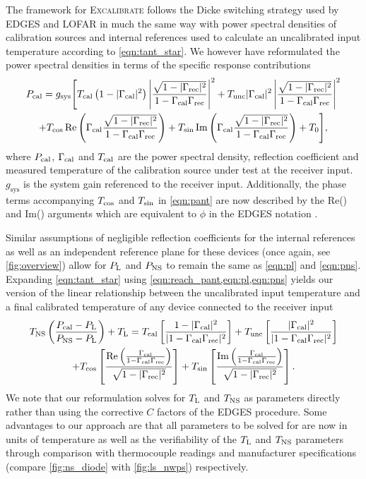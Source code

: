 The framework for \textsc{Excalibrate} follows the Dicke switching strategy used by EDGES \citep{edgesCal} and LOFAR \citep{lofarCal} in much the same way with power spectral densities of calibration sources and internal references used to calculate an uncalibrated input temperature according to \cref{eqn:tant_star}. We however have reformulated the power spectral densities in terms of the specific response contributions
\begin{multline}
    \label{eqn:reach_pant}
    P_{\mathrm{cal}} = g_{\mathrm{sys}} \Bigg[ T_{\mathrm{cal}}\left(1-|\Gamma_{\mathrm{cal}}|^2\right)\left|\frac{\sqrt{1 - |\Gamma_{\mathrm{rec}}|^2}}{1-\Gamma_{\mathrm{cal}}\Gamma_{\mathrm{rec}}}\right|^2 + T_{\mathrm{unc}}|\Gamma_{\mathrm{cal}}|^2\left|\frac{\sqrt{1 - |\Gamma_{\mathrm{rec}}|^2}}{1-\Gamma_{\mathrm{cal}}\Gamma_{\mathrm{rec}}}\right|^2 \\
    + T_{\mathrm{cos}}\operatorname{Re}\left(\Gamma_{\mathrm{cal}}\frac{\sqrt{1 - |\Gamma_{\mathrm{rec}}|^2}}{1-\Gamma_{\mathrm{cal}}\Gamma_{\mathrm{rec}}}\right) + T_{\mathrm{sin}}\operatorname{Im}\left(\Gamma_{\mathrm{cal}}\frac{\sqrt{1 - |\Gamma_{\mathrm{rec}}|^2}}{1-\Gamma_{\mathrm{cal}}\Gamma_{\mathrm{rec}}}\right) + T_0 \Bigg],
\end{multline}
where $P_{\mathrm{cal}}$, $\Gamma_{\mathrm{cal}}$ and $T_{\mathrm{cal}}$ are the power spectral density, reflection coefficient and measured temperature of the calibration source under test at the receiver input. $g_{\mathrm{sys}}$ is the system gain referenced to the receiver input. Additionally, the phase terms accompanying $T_{\mathrm{cos}}$ and $T_{\mathrm{sin}}$ in \cref{eqn:pant} are now described by the Re() and Im() arguments which are equivalent to $\phi$ in the EDGES notation \cite{rogersCal}.

Similar assumptions of negligible reflection coefficients for the internal references as well as an independent reference plane for these devices (once again, see \cref{fig:overview}) allow for $P_{\mathrm{L}}$ and $P_{\mathrm{NS}}$ to remain the same as \cref{eqn:pl} and \cref{eqn:pns}. Expanding \cref{eqn:tant_star} using \cref{eqn:reach_pant,eqn:pl,eqn:pns} yields our version of the linear relationship between the uncalibrated input temperature and a final calibrated temperature of any device connected to the receiver input
\begin{multline}
    \label{eqn:caleqn}
    T_{\mathrm{NS}}\left( \frac{P_{\mathrm{cal}} - P_{\mathrm{L}}}{P_{\mathrm{NS}} - P_{\mathrm{L}}} \right) + T_{\mathrm{L}} = T_{\mathrm{cal}}\left[ \frac{1-|\Gamma_{\mathrm{cal}}|^2}{|1-\Gamma_{\mathrm{cal}}\Gamma_{\mathrm{rec}}|^2} \right] + T_{\mathrm{unc}}\left[ \frac{|\Gamma_{\mathrm{cal}}|^2}{|1-\Gamma_{\mathrm{cal}}\Gamma_{\mathrm{rec}}|^2} \right] \\
    + T_{\mathrm{cos}}\left[ \frac{\operatorname{Re}\left(\frac{\Gamma_{\mathrm{cal}}}{1-\Gamma_{\mathrm{cal}}\Gamma_{\mathrm{rec}}}\right)}{\sqrt{1-|\Gamma_{\mathrm{rec}}|^2}} \right] + T_{\mathrm{sin}}\left[ \frac{\operatorname{Im}\left(\frac{\Gamma_{\mathrm{cal}}}{1-\Gamma_{\mathrm{cal}}\Gamma_{\mathrm{rec}}}\right)}{\sqrt{1-|\Gamma_{\mathrm{rec}}|^2}} \right].
\end{multline}
We note that our reformulation solves for $T_{\mathrm{L}}$ and $T_{\mathrm{NS}}$ as parameters directly rather than using the corrective $C$ factors of the EDGES procedure. Some advantages to our approach are that all parameters to be solved for are now in units of temperature as well as the verifiability of the $T_{\mathrm{L}}$ and $T_{\mathrm{NS}}$ parameters through comparison with thermocouple readings and manufacturer specifications (compare \cref{fig:ns_diode} with \cref{fig:ls_nwps}) respectively. 

